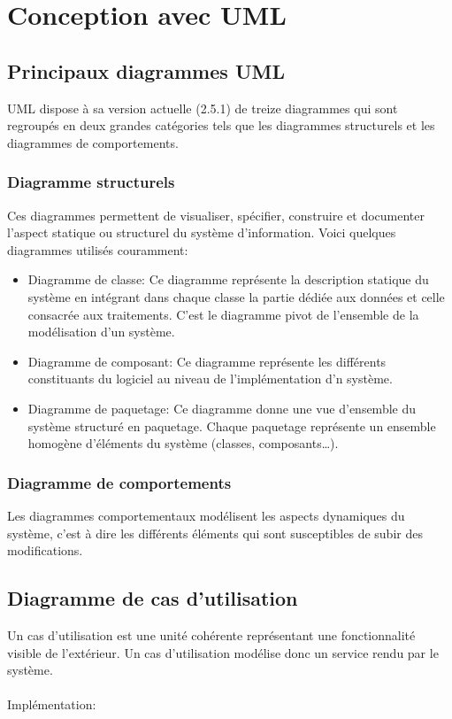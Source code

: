 	\section{Conception avec UML}
		\subsection{Principaux diagrammes UML}
			UML dispose à sa version actuelle (2.5.1) de treize diagrammes qui sont regroupés en deux grandes catégories tels que les diagrammes structurels et les diagrammes de comportements.
		\subsubsection{Diagramme structurels}
			Ces diagrammes permettent de visualiser, spécifier, construire et documenter l'aspect statique ou structurel du système d'information. Voici quelques diagrammes utilisés couramment:\\
			\begin{itemize}
				\item Diagramme de classe: Ce diagramme représente la description statique du système en intégrant dans chaque classe la partie dédiée aux données et celle consacrée aux traitements. C’est le diagramme pivot de l’ensemble de la modélisation d’un système.\cite{definition_diagramme_classe}\\
				
				\item Diagramme de composant: Ce diagramme représente
				les différents constituants du logiciel au niveau de l’implémentation d’n système.\cite{definition_diagramme_composant}\\
				
				\item Diagramme de paquetage: Ce diagramme donne une
				vue d’ensemble du système structuré en paquetage. Chaque paquetage représente un ensemble homogène d’éléments du système (classes, composants…).\cite{definition_diagramme_paquetage}\\
			\end{itemize}
		\subsubsection{Diagramme de comportements}
			Les diagrammes comportementaux modélisent les aspects dynamiques du système, c'est à dire les différents éléments qui sont susceptibles de subir des modifications.\\
		\subsection{Diagramme de cas d'utilisation}
		Un cas d'utilisation est une unité cohérente représentant une fonctionnalité visible de l'extérieur. Un cas d'utilisation modélise donc un service rendu par le système.\cite{cas_d_utilisation}\\
		\\Implémentation:\\
